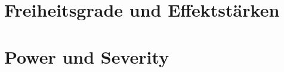\documentclass[handout,aspectratio=1610,dvipsnames]{beamer}
\begin{document}
  \section{Freiheitsgrade und Effektstärken}
  \let\woopsi\section\let\section\subsection\let\subsection\subsubsection
  
  \let\subsection\section\let\section\woopsi

  \section{Power und Severity}
  \let\woopsi\section\let\section\subsection\let\subsection\subsubsection
  
  \let\subsection\section\let\section\woopsi
\end{document}
